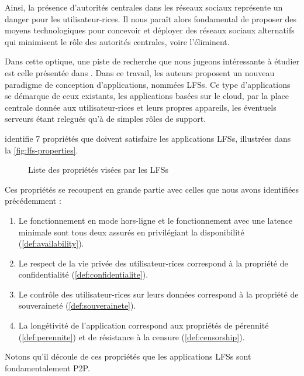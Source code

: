 Ainsi, la présence d'autorités centrales dans les réseaux sociaux représente un danger pour les utilisateur-rices.
Il nous paraît alors fondamental de proposer des moyens technologiques pour concevoir et déployer des réseaux sociaux alternatifs qui minimisent le rôle des autorités centrales, voire l'éliminent.

Dans cette optique, une piste de recherche que nous jugeons intéressante à étudier est celle présentée dans \cite{localfirstsoftware2019}.
Dans ce travail, les auteurs proposent un nouveau paradigme de conception d'applications, nommées \acp{LFS}.
Ce type d'applications se démarque de ceux existants, \eg les applications basées sur le cloud, par la place centrale donnée aux utilisateur-rices et leurs propres appareils, les éventuels serveurs étant relegués qu'à de simples rôles de support.

\cite{localfirstsoftware2019} identifie 7 propriétés que doivent satisfaire les applications \acp{LFS}, illustrées dans la \autoref{fig:lfs-properties}.
\begin{figure}[!ht]
  \centering
  \caption[Caption for lfs-properties]{Liste des propriétés visées par les \acp{LFS}\footnotemark}
  \label{fig:lfs-properties}
\end{figure}
Ces propriétés se recoupent en grande partie avec celles que nous avons identifiées précédemment :
\begin{enumerate}
  \item Le fonctionnement en mode hors-ligne et le fonctionnement avec une latence minimale sont tous deux assurés en privilégiant la disponibilité \cite{pacelc2012} (\autoref{def:availability}).
  \item Le respect de la vie privée des utilisateur-rices correspond à la propriété de confidentialité (\autoref{def:confidentialite}).
  \item Le contrôle des utilisateur-rices sur leurs données correspond à la propriété de souveraineté (\autoref{def:souverainete}).
  \item La longétivité de l'application correspond aux propriétés de pérennité (\autoref{def:perennite}) et de résistance à la censure (\autoref{def:censorship}).
\end{enumerate}
Notons qu'il découle de ces propriétés que les applications \acp{LFS} sont fondamentalement \ac{P2P}.

